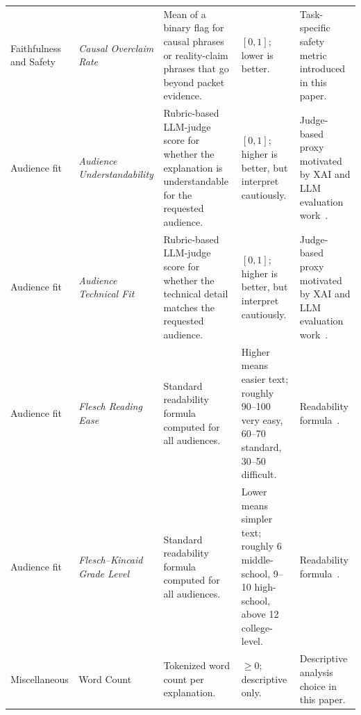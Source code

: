 \documentclass[sigconf]{acmart}
\begin{document}
\begin{table}[t!]
\begin{tabular}{>{\raggedright\arraybackslash}p{1.8cm}>{\raggedright\arraybackslash}p{2.8cm}>{\raggedright\arraybackslash}p{6cm}>{\raggedright\arraybackslash}p{2.5cm}>{\raggedright\arraybackslash}p{3.1cm}}
Faithfulness and Safety & \emph{Causal Overclaim Rate} & Mean of a binary flag for causal phrases or reality-claim phrases that go beyond packet evidence. & $[0,1]$; lower is better. & Task-specific safety metric introduced in this paper. \\
Audience fit & \emph{Audience Understandability} & Rubric-based LLM-judge score for whether the explanation is understandable for the requested audience. & $[0,1]$; higher is better, but interpret cautiously. & Judge-based proxy motivated by XAI and LLM evaluation work~\cite{kim2024human,liu2023geval,huang2025judge}. \\
Audience fit & \emph{Audience Technical Fit} & Rubric-based LLM-judge score for whether the technical detail matches the requested audience. & $[0,1]$; higher is better, but interpret cautiously. & Judge-based proxy motivated by XAI and LLM evaluation work~\cite{kim2024human,liu2023geval,huang2025judge}. \\
Audience fit & \emph{Flesch Reading Ease} & Standard readability formula computed for all audiences. & Higher means easier text; roughly 90--100 very easy, 60--70 standard, 30--50 difficult. & Readability formula~\cite{flesch1948readability}. \\
Audience fit & \emph{Flesch--Kincaid Grade Level} & Standard readability formula computed for all audiences. & Lower means simpler text; roughly 6 middle-school, 9--10 high-school, above 12 college-level. & Readability formula~\cite{kincaid1975derivation}. \\
Miscellaneous & Word Count & Tokenized word count per explanation. & $\geq 0$; descriptive only. & Descriptive analysis choice in this paper. \\
\bottomrule
\end{tabular}
\vspace{-2mm}
\end{table}
\end{document}
